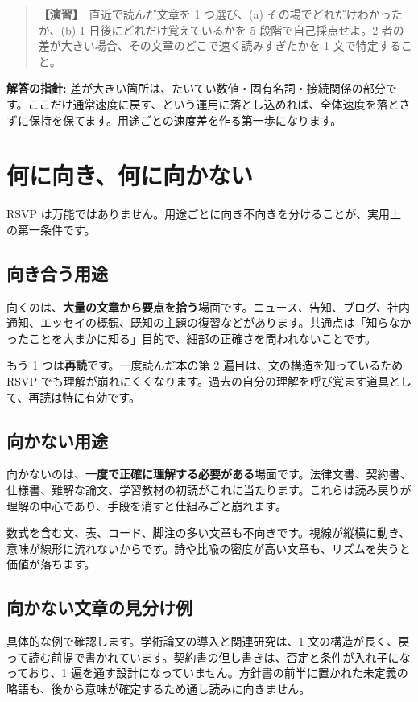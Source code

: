 \documentclass{article}
\begin{document}
\begin{quote}
\textbf{【演習】}\ 直近で読んだ文章を 1 つ選び、(a) その場でどれだけわかったか、(b) 1 日後にどれだけ覚えているかを 5 段階で自己採点せよ。2 者の差が大きい場合、その文章のどこで速く読みすぎたかを 1 文で特定すること。
\end{quote}

\textbf{解答の指針:} 差が大きい箇所は、たいてい数値・固有名詞・接続関係の部分です。ここだけ通常速度に戻す、という運用に落とし込めれば、全体速度を落とさずに保持を保てます。用途ごとの速度差を作る第一歩になります。

\section{何に向き、何に向かない}

RSVP は万能ではありません。用途ごとに向き不向きを分けることが、実用上の第一条件です。

\subsection{向き合う用途}

向くのは、\textbf{大量の文章から要点を拾う}場面です。ニュース、告知、ブログ、社内通知、エッセイの概観、既知の主題の復習などがあります。共通点は「知らなかったことを大まかに知る」目的で、細部の正確さを問われないことです。

もう 1 つは\textbf{再読}です。一度読んだ本の第 2 遍目は、文の構造を知っているため RSVP でも理解が崩れにくくなります。過去の自分の理解を呼び覚ます道具として、再読は特に有効です。

\subsection{向かない用途}

向かないのは、\textbf{一度で正確に理解する必要がある}場面です。法律文書、契約書、仕様書、難解な論文、学習教材の初読がこれに当たります。これらは読み戻りが理解の中心であり、手段を消すと仕組みごと崩れます。

数式を含む文、表、コード、脚注の多い文章も不向きです。視線が縦横に動き、意味が線形に流れないからです。詩や比喩の密度が高い文章も、リズムを失うと価値が落ちます。

\subsection{向かない文章の見分け例}

具体的な例で確認します。学術論文の導入と関連研究は、1 文の構造が長く、戻って読む前提で書かれています。契約書の但し書きは、否定と条件が入れ子になっており、1 遍を通す設計になっていません。方針書の前半に置かれた未定義の略語も、後から意味が確定するため通し読みに向きません。
\end{document}
